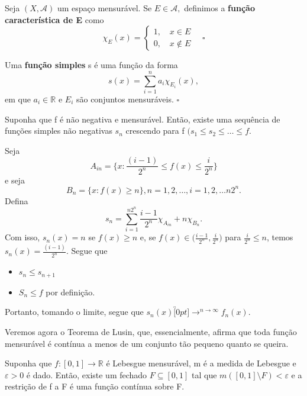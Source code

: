 \documentclass[MeasureTheory/measure_theory.tex]{subfiles}
\begin{document}
\begin{def*}
	Seja \((X, \mathcal{A})\) um espaço mensurável. Se \(E\in \mathcal{A},\) definimos a \textbf{função característica de E} como
	\[
		\chi_{E}(x)  = \left\{\begin{array}{ll}
			1,\quad x\in E \\
			0,\quad x\not\in E
		\end{array}\right.\quad \square
	\]
\end{def*}
\begin{def*}
	Uma \textbf{função simples} s é uma função da forma
	\[
		s(x) = \sum\limits_{i=1}^{n}a_{i}\chi_{E_{i}}(x),
	\]
	em que \(a_{i}\in \mathbb{R}\) e \(E_{i}\) são conjuntos mensuráveis. \(\square\)
\end{def*}
\begin{prop*}
	Suponha que f é não negativa e mensurável. Então, existe uma sequência de funções simples não negativas \(s_{n}\) crescendo para f \((s_1\leq s_2\leq \dotsc \leq f\).
\end{prop*}
\begin{proof*}
	Seja
	\[
		A_{in} = \biggl\{x: \frac{(i-1)}{2^{n}} \leq f(x) \leq \frac{i}{2^{n}}\biggr\}
	\]
	e seja
	\[
		B_{n} = \{x: f(x) \geq n\}, n =1, 2,\dotsc , i = 1, 2, \dotsc n2^{n}.
	\]
	Defina
	\[
		s_{n} = \sum\limits_{i=1}^{n2^{n}}\frac{i-1}{2^{n}}\chi_{A_{in}} + n\chi_{B_{n}}.
	\]
	Com isso, \(s_{n}(x) = n \) se \(f(x)\geq n\) e, se \(f(x)\in \biggl(\frac{i-1}{2^{n}}, \frac{i}{2^{n}}\biggr)\) para \(\frac{i}{2^{n}} \leq n\), temos \(s_{n}(x) = \frac{(i-1)}{2^{n}}.\) Segue que
	\begin{itemize}
		\item \(s_{n} \leq s_{n+1}\)
		\item \(S_{n} \leq f\) por definição.
	\end{itemize}
	Portanto, tomando o limite, segue que \(s_{n}(x)\overbracket[0pt]{\longrightarrow}^{n\to \infty}f_{n}(x)\).
\end{proof*}
Veremos agora o Teorema de Lusin, que, essencialmente, afirma que toda função mensurável é
contínua a menos de um conjunto tão pequeno quanto se queira.
\begin{theorem*}[Lusin]
	Suponha que \(f:[0, 1]\rightarrow \mathbb{R}\) é Lebesgue mensurável, m é a medida de Lebesgue e \(\varepsilon > 0\) é dado. Então, existe um fechado \(F\subseteq [0, 1]\) tal que
	\(m([0, 1]\setminus{F}) < \varepsilon \) e a restrição de f a F é uma função contínua sobre F.
\end{theorem*}
\end{document}
